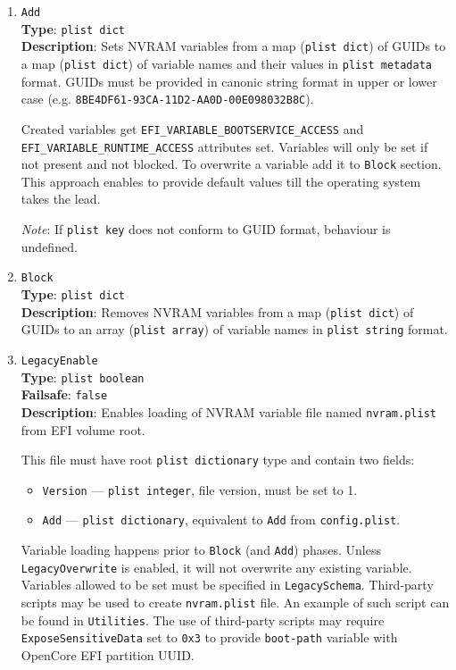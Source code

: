 \documentclass[]{article}
\providecommand{\tightlist}{%
  \setlength{\itemsep}{0pt}\setlength{\parskip}{0pt}}
\begin{document}
\begin{enumerate}
\item
  \texttt{Add}\\
  \textbf{Type}: \texttt{plist\ dict}\\
  \textbf{Description}: Sets NVRAM variables from a map (\texttt{plist\ dict})
  of GUIDs to a map (\texttt{plist\ dict}) of variable names and their values
  in \texttt{plist\ metadata} format. GUIDs must be provided in canonic string
  format in upper or lower case (e.g. \texttt{8BE4DF61-93CA-11D2-AA0D-00E098032B8C}).

  Created variables get \texttt{EFI\_VARIABLE\_BOOTSERVICE\_ACCESS} and
  \texttt{EFI\_VARIABLE\_RUNTIME\_ACCESS} attributes set.
  Variables will only be set if not present and not blocked.
  To overwrite a variable add it to \texttt{Block} section. This approach
  enables to provide default values till the operating system takes the lead.

  \emph{Note}: If \texttt{plist\ key} does not conform to GUID format,
  behaviour is undefined.

\item
  \texttt{Block}\\
  \textbf{Type}: \texttt{plist\ dict}\\
  \textbf{Description}: Removes NVRAM variables from a map (\texttt{plist\ dict})
  of GUIDs to an array (\texttt{plist\ array}) of variable names in
  \texttt{plist\ string} format.

\item
  \texttt{LegacyEnable}\\
  \textbf{Type}: \texttt{plist\ boolean}\\
  \textbf{Failsafe}: \texttt{false}\\
  \textbf{Description}: Enables loading of NVRAM variable file named \texttt{nvram.plist}
  from EFI volume root.

  This file must have root \texttt{plist\ dictionary} type and contain two fields:
  \begin{itemize}
  \tightlist
  \item \texttt{Version} --- \texttt{plist\ integer}, file version, must be set to 1.
  \item \texttt{Add} --- \texttt{plist\ dictionary}, equivalent to \texttt{Add} from
  \texttt{config.plist}.
  \end{itemize}

  Variable loading happens prior to \texttt{Block} (and \texttt{Add}) phases. Unless
  \texttt{LegacyOverwrite} is enabled, it will not overwrite any existing variable.
  Variables allowed to be set must be specified in \texttt{LegacySchema}.
  Third-party scripts may be used to create \texttt{nvram.plist}
  file. An example of such script can be found in \texttt{Utilities}. The use of third-party
  scripts may require \texttt{ExposeSensitiveData} set to \texttt{0x3} to provide
  \texttt{boot-path} variable with OpenCore EFI partition UUID.


\end{enumerate}
\end{document}
